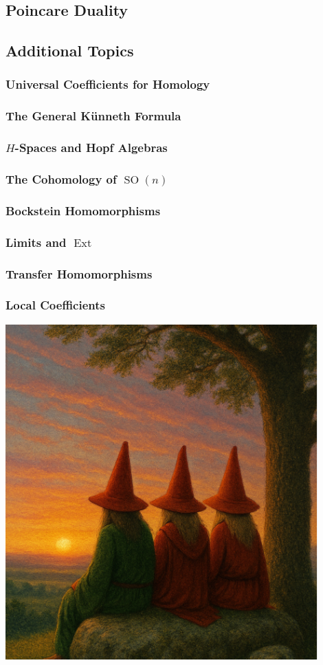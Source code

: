 \documentclass[11pt, a4paper, final]{amsart}
\DeclareMathOperator{\SO}{SO}
\DeclareMathOperator{\Ext}{Ext}
\numberwithin{theorem}{section}
\theoremstyle{definition}
\theoremstyle{remark}
\begin{document}
\subsection{Poincare Duality}
\subsection{Additional Topics}
\subsubsection{Universal Coefficients for Homology}
\subsubsection{The General K\"unneth Formula}
\subsubsection{$H$-Spaces and Hopf Algebras}
\subsubsection{The Cohomology of $\SO(n)$}
\subsubsection{Bockstein Homomorphisms}
\subsubsection{Limits and $\Ext$}
\subsubsection{Transfer Homomorphisms}
\subsubsection{Local Coefficients}

\printbibliography
\nocite{*}

\clearpage
\thispagestyle{empty}

\begin{center}
    \includegraphics[width=120mm]{happy_ending.png}
\end{center}
\end{document}
